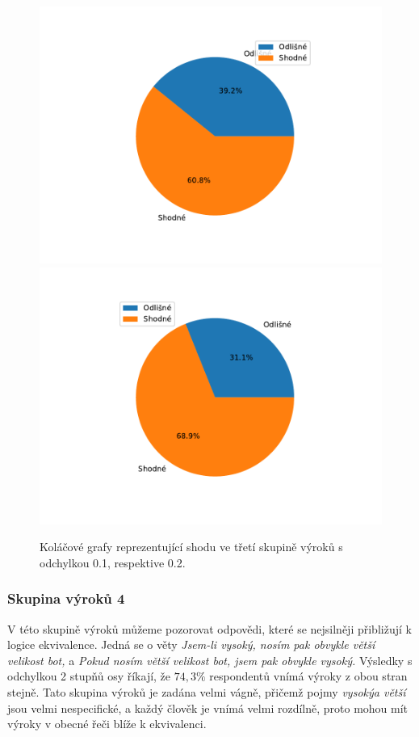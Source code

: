     \begin{figure}[H]
    \caption{Koláčové grafy reprezentující shodu ve třetí skupině výrok\r u s odchylkou 0.1, respektive 0.2.}
                \includegraphics[scale=0.5]{template-fig/group2.pdf}
                \includegraphics[scale=0.5]{template-fig/group22.pdf}
            \end{figure}

\subsubsection{Skupina výrok\r u 4}
V této skupině výrok\r u m\r užeme pozorovat odpovědi, které se nejsilněji přibližují k logice ekvivalence. Jedná se o věty \textit{\clqq Jsem-li vysoký, nosím pak obvykle větší velikost bot,\crqq } \space a \textit{\clqq Pokud nosím větší velikost bot, jsem pak obvykle vysoký.\crqq } \space Výsledky s odchylkou 2 stup\v n\r u osy říkají, že $74,3 $\space$ \%$ respondent\r u vnímá výroky z obou stran stejně. Tato skupina výrok\r u je zadána velmi vágně, přičemž pojmy \textit{\clqq vysoký\crqq  a \clqq větší\crqq } jsou velmi nespecifické, a každý člověk je vnímá velmi rozdílně, proto mohou mít výroky v obecné řeči blíže k ekvivalenci.

